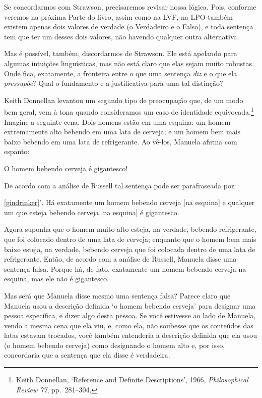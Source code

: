 Se concordarmos com Strawson, precisaremos revisar nossa lógica.
Pois, conforme veremos na próxima Parte do livro, assim como na LVF, na LPO também existem apenas dois valores de verdade (o Verdadeiro e o Falso), e toda sentença tem que ter um desses dois valores, não havendo qualquer outra alternativa.

Mas é possível, também, discordarmos de Strawson.
Ele está apelando para algumas intuições linguísticas, mas não está claro que elas sejam muito robustas.
Onde fica, exatamente, a fronteira entre o que uma sentença \emph{diz} e o que ela \emph{pressupõe}?
Qual o fundamento e a justificativa para uma tal distinção?

Keith Donnellan levantou um segundo tipo de preocupação que, de um modo bem geral, vem à tona quando consideramos um caso de identidade equivocada.\footnote{
	Keith Donnellan, `Reference and Definite Descriptions', 1966, \emph{Philosophical Review 77}, pp.\ 281--304.}
Imagine a seguinte cena.
Dois homens estão em uma esquina: um homem extremamente alto bebendo em  uma lata de cerveja; e um homem bem mais baixo bebendo em uma lata de refrigerante.
Ao vê-los, Manuela afirma com espanto:

	\begin{earg}
		\item[\ex{gindrinker}] O homem bebendo cerveja é gigantesco!
	\end{earg}
De acordo com a análise de Russell tal sentença pode ser parafraseada por:
	\begin{earg}
		\item[\ref{gindrinker}$'$.] Há exatamente um homem bebendo cerveja [na esquina] e qualquer um que esteja bebendo cerveja [na esquina] é gigantesco.		
	\end{earg}
Agora suponha que o homem muito alto esteja, na verdade, bebendo refrigerante, que foi colocado dentro de uma lata de cerveja; enquanto que o homem bem mais baixo esteja, na verdade, bebendo cerveja que foi colocada dentro de uma lata de refrigerante.
Então, de acordo com a análise de Russell, Manuela disse uma sentença falsa.
Porque há, de fato, exatamente um homem bebendo cerveja na esquina, mas ele não é gigantesco.

Mas será que Manuela disse mesmo uma sentença falsa?
Parece claro que Manuela usou a descrição definida `o homem bebendo cerveja' para designar uma pessoa específica, e dizer algo desta pessoa.
Se você estivesse ao lado de Manuela, vendo a mesma cena que ela viu, e, como ela, não soubesse que os conteúdos das latas estavam trocados, você também  entenderia a descrição definida que ela usou (o homem bebendo cerveja) como designando o homem alto e, por isso, concordaria que a sentença que ela disse é verdadeira.

